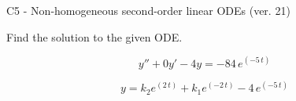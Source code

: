 \begin{exercise}
  \begin{exerciseTitle}C5 - Non-homogeneous second-order linear ODEs (ver. 21)\end{exerciseTitle}
  \begin{exerciseStatement}
    
Find the solution to the given ODE.

    
\[y''+0y'-4y = -84 \, e^{\left(-5 \, t\right)}\]

  \end{exerciseStatement}
  \begin{exerciseAnswer}
    
\[y= k_{2} e^{\left(2 \, t\right)} + k_{1} e^{\left(-2 \, t\right)} - 4 \, e^{\left(-5 \, t\right)}\]

  \end{exerciseAnswer}
\end{exercise}